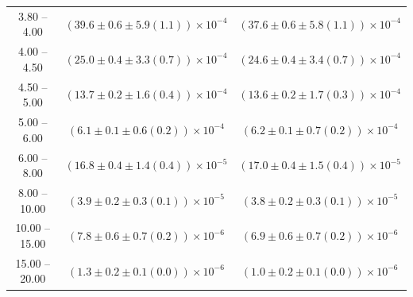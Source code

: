 \begin{table}
\begin{center}
\begin{tabular}{ c | c c }
3.80 -- 4.00 & $(39.6\pm0.6\pm5.9(1.1))\times10^{-4}$ & $(37.6\pm0.6\pm5.8(1.1))\times10^{-4}$ \\ 
4.00 -- 4.50 & $(25.0\pm0.4\pm3.3(0.7))\times10^{-4}$ & $(24.6\pm0.4\pm3.4(0.7))\times10^{-4}$ \\ 
4.50 -- 5.00 & $(13.7\pm0.2\pm1.6(0.4))\times10^{-4}$ & $(13.6\pm0.2\pm1.7(0.3))\times10^{-4}$ \\ 
5.00 -- 6.00 & $(6.1\pm0.1\pm0.6(0.2))\times10^{-4}$ & $(6.2\pm0.1\pm0.7(0.2))\times10^{-4}$ \\ 
6.00 -- 8.00 & $(16.8\pm0.4\pm1.4(0.4))\times10^{-5}$ & $(17.0\pm0.4\pm1.5(0.4))\times10^{-5}$ \\ 
8.00 -- 10.00 & $(3.9\pm0.2\pm0.3(0.1))\times10^{-5}$ & $(3.8\pm0.2\pm0.3(0.1))\times10^{-5}$ \\ 
10.00 -- 15.00 & $(7.8\pm0.6\pm0.7(0.2))\times10^{-6}$ & $(6.9\pm0.6\pm0.7(0.2))\times10^{-6}$ \\ 
15.00 -- 20.00 & $(1.3\pm0.2\pm0.1(0.0))\times10^{-6}$ & $(1.0\pm0.2\pm0.1(0.0))\times10^{-6}$ \\ 
\hline
\end{tabular}
\end{center}
\end{table}
 
